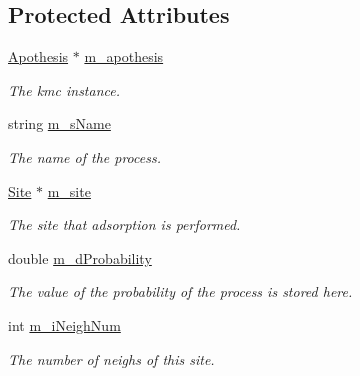 \subsection*{Protected Attributes}
\begin{DoxyCompactItemize}
\item 
\mbox{\label{classMicroProcesses_1_1Adsorption_af6e9c1e66d6123567c7067d1ae437b4f}} 
\mbox{\hyperlink{classApothesis}{Apothesis}} $\ast$ \mbox{\hyperlink{classMicroProcesses_1_1Adsorption_af6e9c1e66d6123567c7067d1ae437b4f}{m\+\_\+apothesis}}
\begin{DoxyCompactList}\small\item\em The kmc instance. \end{DoxyCompactList}\item 
\mbox{\label{classMicroProcesses_1_1Adsorption_a126b71d293e9dd6c9c8642777b964dad}} 
string \mbox{\hyperlink{classMicroProcesses_1_1Adsorption_a126b71d293e9dd6c9c8642777b964dad}{m\+\_\+s\+Name}}
\begin{DoxyCompactList}\small\item\em The name of the process. \end{DoxyCompactList}\item 
\mbox{\label{classMicroProcesses_1_1Adsorption_a7860184cf3917fe62a8e137a44faf6f2}} 
\mbox{\hyperlink{classSurfaceTiles_1_1Site}{Site}} $\ast$ \mbox{\hyperlink{classMicroProcesses_1_1Adsorption_a7860184cf3917fe62a8e137a44faf6f2}{m\+\_\+site}}
\begin{DoxyCompactList}\small\item\em The site that adsorption is performed. \end{DoxyCompactList}\item 
\mbox{\label{classMicroProcesses_1_1Adsorption_a5c969a024e7decd889faee819af27bbc}} 
double \mbox{\hyperlink{classMicroProcesses_1_1Adsorption_a5c969a024e7decd889faee819af27bbc}{m\+\_\+d\+Probability}}
\begin{DoxyCompactList}\small\item\em The value of the probability of the process is stored here. \end{DoxyCompactList}\item 
\mbox{\label{classMicroProcesses_1_1Adsorption_a8d04e6d6ae56964fd9db536e4926bb42}} 
int \mbox{\hyperlink{classMicroProcesses_1_1Adsorption_a8d04e6d6ae56964fd9db536e4926bb42}{m\+\_\+i\+Neigh\+Num}}
\begin{DoxyCompactList}\small\item\em The number of neighs of this site. \end{DoxyCompactList}\end{DoxyCompactItemize}


